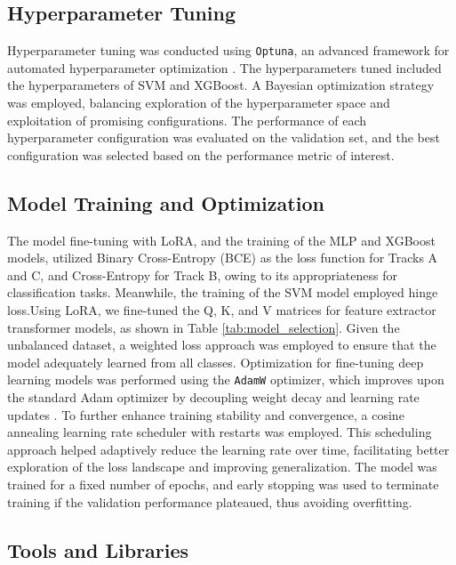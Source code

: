 \subsection{Hyperparameter Tuning}

Hyperparameter tuning was conducted using \texttt{Optuna}, an advanced framework for automated hyperparameter optimization \citep{Akiba2019Optuna}. The hyperparameters tuned included the hyperparameters of SVM and XGBoost. A Bayesian optimization strategy was employed, balancing exploration of the hyperparameter space and exploitation of promising configurations. The performance of each hyperparameter configuration was evaluated on the validation set, and the best configuration was selected based on the performance metric of interest.

\subsection{Model Training and Optimization}

The model fine-tuning with LoRA, and the training of the MLP and XGBoost models, utilized Binary Cross-Entropy (BCE) as the loss function for Tracks A and C, and Cross-Entropy for Track B, owing to its appropriateness for classification tasks. Meanwhile, the training of the SVM model employed hinge loss.Using LoRA, we fine-tuned the Q, K, and V matrices for feature extractor transformer models, as shown in Table \ref{tab:model_selection}. Given the unbalanced dataset, a weighted loss approach was employed to ensure that the model adequately learned from all classes. Optimization for fine-tuning deep learning models was performed using the \texttt{AdamW} optimizer, which improves upon the standard Adam optimizer by decoupling weight decay and learning rate updates \citep{Loshchilov2019AdamW}. To further enhance training stability and convergence, a cosine annealing learning rate scheduler with restarts\cite{loshchilov2017sgdrstochasticgradientdescent} was employed. This scheduling approach helped adaptively reduce the learning rate over time, facilitating better exploration of the loss landscape and improving generalization. The model was trained for a fixed number of epochs, and early stopping was used to terminate training if the validation performance plateaued, thus avoiding overfitting.

\subsection{Tools and Libraries}

